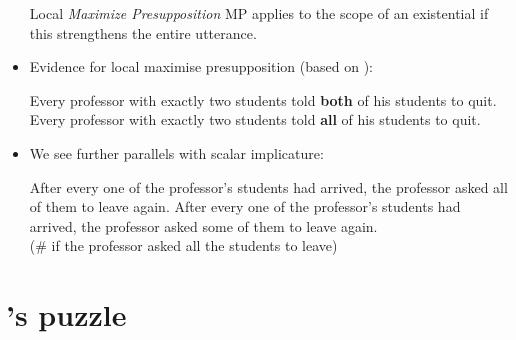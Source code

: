 \documentclass[landscape,twocolumn,cronos,paper=letter]{ling-handout}
\begin{document}
\begin{itemize}
            \begin{tcolorbox}
              Local \textit{Maximize Presupposition}
              \tcblower
              MP applies to the scope of an existential if this strengthens the
              entire utterance.
            \end{tcolorbox}

            \item Evidence for local maximise presupposition (based on
            \citealt{percus2006antipresuppositions}):

            \pex
            \a Every professor with exactly two students told \textbf{both} of his
            students to quit.
            \a\ljudge{\#}Every professor with exactly two students told \textbf{all} of
            his students to quit.
            \xe

          \item We see further parallels with scalar implicature:

            \pex
            \a After every one of the professor's students had arrived, the
            professor asked all of them to leave again.
            \a After every one of the professor's students had arrived, the
            professor asked some of them to leave again.\\
            (\# if the professor asked all the students to leave)
            \xe

        \end{itemize}










\section{\citeauthor{spector2007}'s puzzle}
\end{document}
